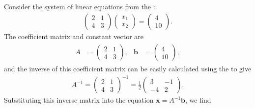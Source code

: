 \documentclass[letterpaper,10pt,english]{jupyterBook}
\begin{document}
\sphinxAtStartPar
Consider the system of linear equations from the {\hyperref[\detokenize{_pages/2.0_Linear_systems:systems-of-linear-equations-chapter}]{}}:
\begin{equation*}
\begin{split} \begin{pmatrix}
    2 & 1 \\
    4 & 3
\end{pmatrix}
\begin{pmatrix}
    x_1 \\ x_2
\end{pmatrix} =
\begin{pmatrix}
    4 \\ 10
\end{pmatrix}. \end{split}
\end{equation*}
\sphinxAtStartPar
The coefficient matrix and constant vector are
\begin{equation*}
\begin{split} \begin{align*}
    A &= \begin{pmatrix}
        2 & 1 \\
        4 & 3
    \end{pmatrix}, &
    \mathbf{b} &= \begin{pmatrix} 4 \\ 10 \end{pmatrix},
\end{align*} \end{split}
\end{equation*}
\sphinxAtStartPar
and the inverse of this coefficient matrix can be easily calculated using the {\hyperref[\detokenize{_pages/1.5_Inverse_matrix:adjoint-determinant-formula-theorem}]{}} to give
\begin{equation*}
\begin{split} A^{-1} = \begin{pmatrix}
    2 & 1 \\
    4 & 3
\end{pmatrix}^{-1}
= \frac{1}{2} \begin{pmatrix}
    3 & -1 \\
    -4 & 2
\end{pmatrix}. \end{split}
\end{equation*}
\sphinxAtStartPar
Substituting this inverse matrix into the equation \(\mathbf{x} = A^{-1}\mathbf{b}\), we find
\end{document}
